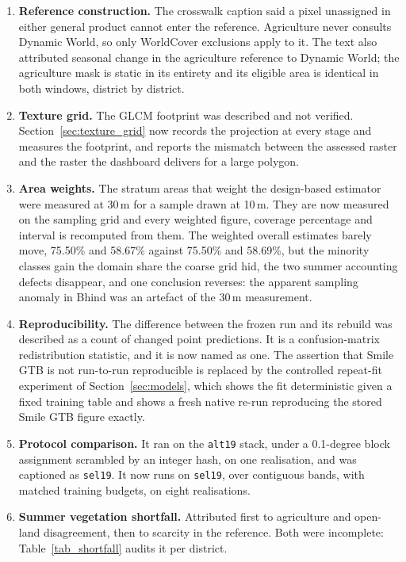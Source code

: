 \documentclass[conference]{IEEEtran}
\begin{document}
\begin{enumerate}
    \item \textbf{Reference construction.} The crosswalk caption said a pixel unassigned in either general product cannot enter the reference. Agriculture never consults Dynamic World, so only WorldCover exclusions apply to it. The text also attributed seasonal change in the agriculture reference to Dynamic World; the agriculture mask is static in its entirety and its eligible area is identical in both windows, district by district.
    \item \textbf{Texture grid.} The GLCM footprint was described and not verified. Section~\ref{sec:texture_grid} now records the projection at every stage and measures the footprint, and reports the mismatch between the assessed raster and the raster the dashboard delivers for a large polygon.
    \item \textbf{Area weights.} The stratum areas that weight the design-based estimator were measured at 30\,m for a sample drawn at 10\,m. They are now measured on the sampling grid and every weighted figure, coverage percentage and interval is recomputed from them. The weighted overall estimates barely move, 75.50\% and 58.67\% against 75.50\% and 58.69\%, but the minority classes gain the domain share the coarse grid hid, the two summer accounting defects disappear, and one conclusion reverses: the apparent sampling anomaly in Bhind was an artefact of the 30\,m measurement.
    \item \textbf{Reproducibility.} The difference between the frozen run and its rebuild was described as a count of changed point predictions. It is a confusion-matrix redistribution statistic, and it is now named as one. The assertion that Smile GTB is not run-to-run reproducible is replaced by the controlled repeat-fit experiment of Section~\ref{sec:models}, which shows the fit deterministic given a fixed training table and shows a fresh native re-run reproducing the stored Smile GTB figure exactly.
    \item \textbf{Protocol comparison.} It ran on the \texttt{alt19} stack, under a 0.1-degree block assignment scrambled by an integer hash, on one realisation, and was captioned as \texttt{sel19}. It now runs on \texttt{sel19}, over contiguous bands, with matched training budgets, on eight realisations.
    \item \textbf{Summer vegetation shortfall.} Attributed first to agriculture and open-land disagreement, then to scarcity in the reference. Both were incomplete: Table~\ref{tab_shortfall} audits it per district.

\end{enumerate}
\end{document}
